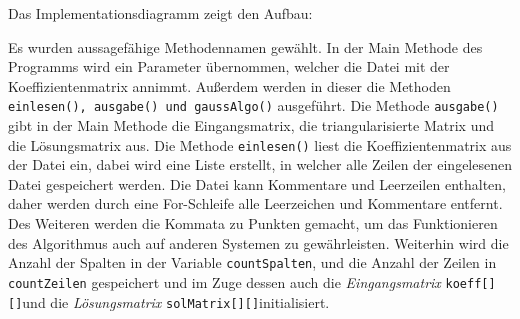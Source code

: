 \documentclass[a4paper, 12pt]{report}
\begin{document}
Das Implementationsdiagramm zeigt den Aufbau: \newline
\begin{center}
{\ttfamily
{}
}

\end{center}
Es wurden aussagefähige Methodennamen gewählt.
In der Main Methode des Programms wird ein Parameter übernommen,
welcher die Datei mit der Koeffizientenmatrix annimmt. Außerdem werden
in dieser die Methoden \texttt{einlesen(), ausgabe() und gaussAlgo()} ausgeführt.
Die Methode \texttt{ausgabe()} gibt in der Main Methode die Eingangsmatrix, die triangularisierte Matrix
und die Lösungsmatrix aus. \newline
Die Methode \texttt{einlesen()} liest die Koeffizientenmatrix aus der Datei ein,
dabei wird eine Liste erstellt, in welcher alle Zeilen der eingelesenen Datei gespeichert werden.
Die Datei kann Kommentare und Leerzeilen enthalten, daher werden durch eine For-Schleife alle Leerzeichen und Kommentare entfernt.
Des Weiteren werden die Kommata zu Punkten gemacht,
um das Funktionieren des Algorithmus auch auf anderen Systemen zu gewährleisten.
Weiterhin wird die Anzahl der Spalten in der Variable \texttt{countSpalten},
und die Anzahl der Zeilen in \texttt{countZeilen} gespeichert und
im Zuge dessen auch die \textit{Eingangsmatrix} \texttt{koeff[][]}und die \textit{Lösungsmatrix} \texttt{solMatrix[][]}initialisiert.
\end{document}
